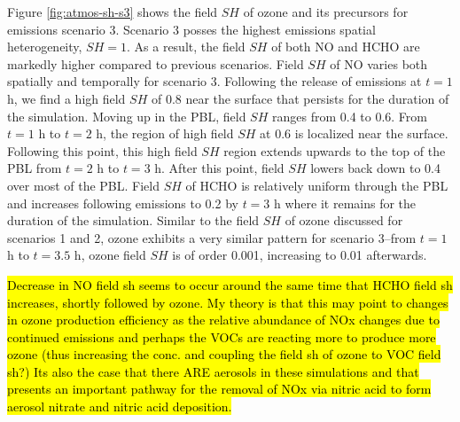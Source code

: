 Figure \ref{fig:atmos-sh-s3} shows the field $SH$ of ozone and its precursors for emissions scenario 3. Scenario 3 posses the highest emissions spatial heterogeneity, $SH=1$. As a result, the field $SH$ of both NO and HCHO are markedly higher compared to previous scenarios. Field $SH$ of NO varies both spatially and temporally for scenario 3. Following the release of emissions at $t=1$ h, we find a high field $SH$ of 0.8 near the surface that persists for the duration of the simulation. Moving up in the PBL, field $SH$ ranges from 0.4 to 0.6. From $t=1$ h to $t=2$ h, the region of high field $SH$ at 0.6 is localized near the surface. Following this point, this high field $SH$ region extends upwards to the top of the PBL from  $t=2$ h to $t=3$ h. After this point, field $SH$ lowers back down to 0.4 over most of the PBL. Field $SH$ of HCHO is relatively uniform through the PBL and increases following emissions to 0.2 by $t=3$ h where it remains for the duration of the simulation. Similar to the field $SH$ of ozone discussed for scenarios 1 and 2, ozone exhibits a very similar pattern for scenario 3--from $t=1$ h to $t=3.5$ h, ozone field $SH$ is of order 0.001, increasing to 0.01 afterwards.

\hl{Decrease in NO field sh seems to occur around the same time that HCHO field sh increases, shortly followed by ozone. My theory is that this may point to changes in ozone production efficiency as the relative abundance of NOx changes due to continued emissions and perhaps the VOCs are reacting more to produce more ozone (thus increasing the conc. and coupling the field sh of ozone to VOC field sh?) Its also the case that there ARE aerosols in these simulations and that presents an important pathway for the removal of NOx via nitric acid to form aerosol nitrate and nitric acid deposition.}







  

